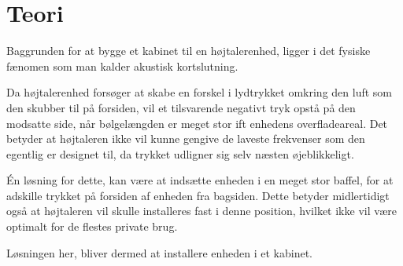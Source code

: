 \chapter{Teori}
Baggrunden for at bygge et kabinet til en højtalerenhed, ligger i det fysiske fænomen som man kalder akustisk kortslutning. 

Da højtalerenhed forsøger at skabe en forskel i lydtrykket omkring den luft som den skubber til på forsiden, vil et tilsvarende negativt tryk opstå på den modsatte side, når bølgelængden er meget stor ift enhedens overfladeareal. Det betyder at højtaleren ikke vil kunne gengive de laveste frekvenser som den egentlig er designet til, da trykket udligner sig selv næsten øjeblikkeligt. 

Én løsning for dette, kan være at indsætte enheden i en meget stor baffel, for at adskille trykket på forsiden af enheden fra bagsiden. Dette betyder midlertidigt også at højtaleren vil skulle installeres fast i denne position, hvilket ikke vil være optimalt for de flestes private brug. 

Løsningen her, bliver dermed at installere enheden i et kabinet. 





